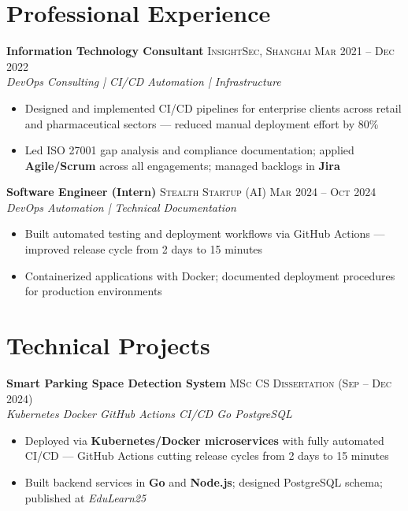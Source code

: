 \documentclass{simpleresume}
\begin{document}
\section{Professional Experience}
\noindent\textbf{Information Technology Consultant}
  \hfill{\sffamily\scshape\small\color{secondary}InsightSec, Shanghai}
  \hfill{\sffamily\scshape\small\color{muted}Mar 2021 -- Dec 2022}\\
  {\itshape\color{secondary}DevOps Consulting | CI/CD Automation | Infrastructure}
\vspace{-0.25mm}
\begin{itemize}
  \item Designed and implemented CI/CD pipelines for enterprise clients across retail and pharmaceutical sectors --- reduced manual deployment effort by 80\%
  \item Led ISO 27001 gap analysis and compliance documentation; applied \textbf{Agile/Scrum} across all engagements; managed backlogs in \textbf{Jira}
\end{itemize}

\vspace{0.05cm}
\noindent\textbf{Software Engineer (Intern)}
  \hfill{\sffamily\scshape\small\color{secondary}Stealth Startup (AI)}
  \hfill{\sffamily\scshape\small\color{muted}Mar 2024 -- Oct 2024}\\
  {\itshape\color{secondary}DevOps Automation | Technical Documentation}
\vspace{-0.25mm}
\begin{itemize}
  \item Built automated testing and deployment workflows via GitHub Actions --- improved release cycle from 2 days to 15 minutes
  \item Containerized applications with Docker; documented deployment procedures for production environments
\end{itemize}

\section{Technical Projects}
\noindent\textbf{Smart Parking Space Detection System}
  \hfill{\sffamily\scshape\small\color{muted}MSc CS Dissertation (Sep -- Dec 2024)}\\
  {\itshape\color{accent}\footnotesize Kubernetes \quad\textbullet\quad Docker \quad\textbullet\quad GitHub Actions CI/CD \quad\textbullet\quad Go \quad\textbullet\quad PostgreSQL}
\vspace{-0.25mm}
\begin{itemize}
  \item Deployed via \textbf{Kubernetes/Docker microservices} with fully automated CI/CD --- GitHub Actions cutting release cycles from 2 days to 15 minutes
  \item Built backend services in \textbf{Go} and \textbf{Node.js}; designed PostgreSQL schema; published at \textit{EduLearn25}
\end{itemize}
\end{document}
